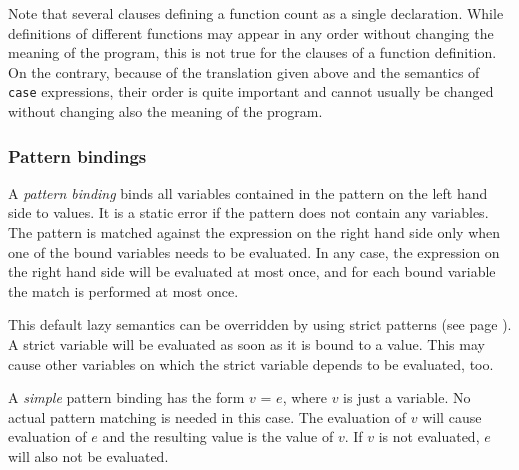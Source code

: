 Note that several clauses defining a function count as a single  declaration. While definitions of different functions may appear in any order without changing the meaning of the program, this is not true for the clauses of a function definition. On the contrary, because of the translation given above and the semantics of \texttt{case} expressions, their order is quite important and cannot usually be changed without changing also the meaning of the program.

\subsubsection{Pattern bindings} \label{patdef}

A \emph{pattern binding} binds all variables contained in the pattern on the left hand side to values. It is a static error if the pattern does not contain any variables. The pattern is matched against the expression on the right hand side only when one of the bound variables needs to be evaluated. In any case, the expression on the right hand side will be evaluated at most once, and for each bound variable the match is performed at most once.

This default lazy semantics can be overridden by using strict patterns (see page \pageref{strictpats}). A strict variable will be evaluated as soon as it is bound to a value. This may cause other variables on which the strict variable depends to be evaluated, too.

A \emph{simple} pattern binding has the form $v$ = $e$, where $v$ is just a variable. No actual pattern matching is needed in this case. The evaluation of $v$ will cause evaluation of $e$ and the resulting value is the value of $v$. If $v$ is not evaluated, $e$ will also not be evaluated.

